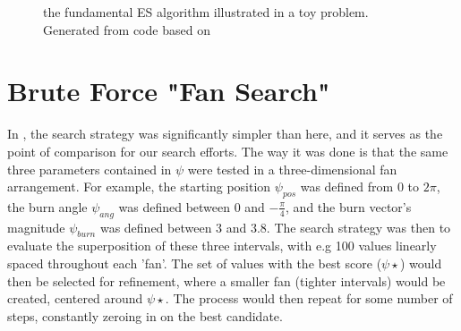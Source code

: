 \begin{figure}
    \centering
    \hfill
    \caption{the fundamental ES algorithm illustrated in a toy problem. Generated from code based on \cite{Salimans2017}}
    \label{fig:esbasic}

\end{figure}



\section{Brute Force "Fan Search"}
In \cite{Saxe2015}, the search strategy was significantly simpler than here, and it serves as the point of comparison for our search efforts. The way it was done is that the same three parameters contained in $\psi$ were tested in a three-dimensional fan arrangement. For example, the starting position $\psi_{pos}$ was defined from 0 to $2\pi$, the burn angle $\psi_{ang}$ was defined between 0 and $-\frac{\pi}{4}$, and the burn vector's magnitude $\psi_{burn}$ was defined between 3 and 3.8. The search strategy was then to evaluate the superposition of these three intervals, with e.g 100 values linearly spaced throughout each 'fan'. The set of values with the best score ($\psi\star$) would then be selected for refinement, where a smaller fan (tighter intervals) would be created, centered around $\psi\star$. The process would then repeat for some number of steps, constantly zeroing in on the best candidate.

